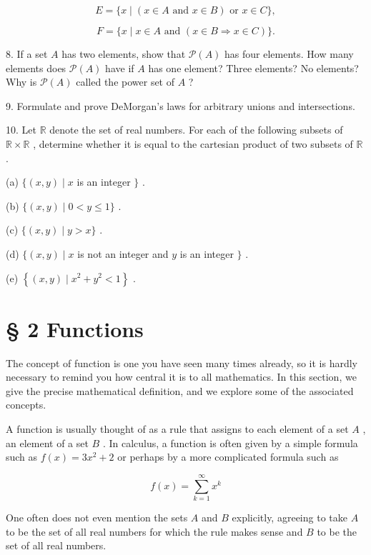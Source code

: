 \[
E = \{ x \mid  \left( {x \in  A\text{ and }x \in  B}\right) \text{ or }x \in  C\} ,
\]

\[
F = \{ x \mid  x \in  A\text{ and }\left( {x \in  B \Rightarrow  x \in  C}\right) \} .
\]

8. If a set \(A\) has two elements, show that \(\mathcal{P}\left( A\right)\) has four elements. How many elements does \(\mathcal{P}\left( A\right)\) have if \(A\) has one element? Three elements? No elements? Why is \(\mathcal{P}\left( A\right)\) called the power set of \(A\) ?

9. Formulate and prove DeMorgan's laws for arbitrary unions and intersections.

10. Let \(\mathbb{R}\) denote the set of real numbers. For each of the following subsets of \(\mathbb{R} \times  \mathbb{R}\) , determine whether it is equal to the cartesian product of two subsets of \(\mathbb{R}\) .

(a) \(\{ \left( {x,y}\right)  \mid  x\) is an integer \(\}\) .

(b) \(\{ \left( {x,y}\right)  \mid  0 < y \leq  1\}\) .

(c) \(\{ \left( {x,y}\right)  \mid  y > x\}\) .

(d) \(\{ \left( {x,y}\right)  \mid  x\) is not an integer and \(y\) is an integer \(\}\) .

(e) \(\left\{  {\left( {x,y}\right)  \mid  {x}^{2} + {y}^{2} < 1}\right\}\) .

\section*{§ 2 Functions}

The concept of function is one you have seen many times already, so it is hardly necessary to remind you how central it is to all mathematics. In this section, we give the precise mathematical definition, and we explore some of the associated concepts.

A function is usually thought of as a rule that assigns to each element of a set \(A\) , an element of a set \(B\) . In calculus, a function is often given by a simple formula such as \(f\left( x\right)  = 3{x}^{2} + 2\) or perhaps by a more complicated formula such as

\[
f\left( x\right)  = \mathop{\sum }\limits_{{k = 1}}^{\infty }{x}^{k}
\]

One often does not even mention the sets \(A\) and \(B\) explicitly, agreeing to take \(A\) to be the set of all real numbers for which the rule makes sense and \(B\) to be the set of all real numbers.

